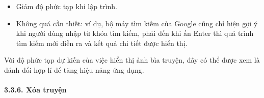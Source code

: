 \documentclass[
]{article}
\begin{document}
\begin{itemize}
\item
  Giảm độ phức tạp khi lập trình.
\item
  Không quá cần thiết: ví dụ, bộ máy tìm kiếm của Google cũng chỉ hiện
  gợi ý khi người dùng nhập từ khóa tìm kiếm, phải đến khi ấn Enter thì
  quá trình tìm kiếm mới diễn ra và kết quả chi tiết được hiển thị.
\end{itemize}

Với độ phức tạp dự kiến của việc hiển thị ảnh bìa truyện, đây có thể
được xem là đánh đổi hợp lí để tăng hiệu năng ứng dụng.

\hypertarget{xuxf3a-truyux1ec7n}{%
\paragraph{\texorpdfstring{3.3.6. Xóa truyện
}{3.3.6. Xóa truyện }}\label{xuxf3a-truyux1ec7n}}
\end{document}
